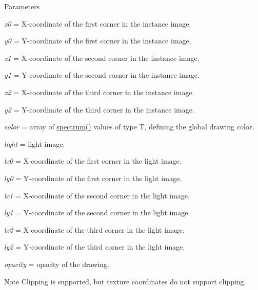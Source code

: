 \begin{DoxyParams}{Parameters}
\item[{\em x0}]= X-\/coordinate of the first corner in the instance image. \item[{\em y0}]= Y-\/coordinate of the first corner in the instance image. \item[{\em x1}]= X-\/coordinate of the second corner in the instance image. \item[{\em y1}]= Y-\/coordinate of the second corner in the instance image. \item[{\em x2}]= X-\/coordinate of the third corner in the instance image. \item[{\em y2}]= Y-\/coordinate of the third corner in the instance image. \item[{\em color}]= array of \hyperlink{structcimg__library_1_1CImg_acd2ee207fa512e34b45ff548082f70ba}{spectrum()} values of type {\ttfamily T}, defining the global drawing color. \item[{\em light}]= light image. \item[{\em lx0}]= X-\/coordinate of the first corner in the light image. \item[{\em ly0}]= Y-\/coordinate of the first corner in the light image. \item[{\em lx1}]= X-\/coordinate of the second corner in the light image. \item[{\em ly1}]= Y-\/coordinate of the second corner in the light image. \item[{\em lx2}]= X-\/coordinate of the third corner in the light image. \item[{\em ly2}]= Y-\/coordinate of the third corner in the light image. \item[{\em opacity}]= opacity of the drawing. \end{DoxyParams}
\begin{DoxyNote}{Note}
Clipping is supported, but texture coordinates do not support clipping. 
\end{DoxyNote}
